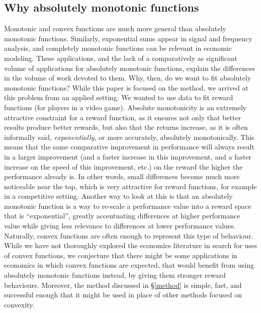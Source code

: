 \documentclass[12pt,a4paper]{article}
\begin{document}
\subsection{Why absolutely monotonic functions}

Monotonic and convex functions are much more general than absolutely monotonic functions. Similarly, exponential sums appear in signal and frequency analysis, and completely monotonic functions can be relevant in economic modeling. These applications, and the lack of a comparatively as significant volume of applications for absolutely monotonic functions, explain the differences in the volume of work devoted to them. Why, then, do we want to fit absolutely monotonic functions? While this paper is focused on the method, we arrived at this problem from an applied setting. We wanted to use data to fit reward functions (for players in a video game). Absolute monotonicity is an extremely attractive constraint for a reward function, as it ensures not only that better results produce better rewards, but also that the returns increase, as it is often informally said, {\emph{exponentially}}, or more accurately, absolutely monotonically. This means that the same comparative improvement in performance will always result in a larger improvement (and a faster increase in this improvement, and a faster increase on the speed of this improvement, etc.) on the reward the higher the performance already is. In other words, small differences become much more noticeable near the top, which is very attractive for reward functions, for example in a competitive setting. Another way to look at this is that an absolutely monotonic function is a way to re-scale a performance value into a reward space that is ``exponential'', greatly accentuating differences at higher performance value while giving less relevance to differences at lower performance values.\\

Naturally, convex functions are often enough to represent this type of behaviour. While we have not thoroughly explored the economics literature in search for uses of convex functions, we conjecture that there might be some applications in economics in which convex functions are expected, that would benefit from using absolutely monotonic functions instead, by giving them stronger reward behaviours. Moreover, the method discussed in \S \ref{method} is simple, fast, and successful enough that it might be used in place of other methods focused on convexity.\\
\end{document}
